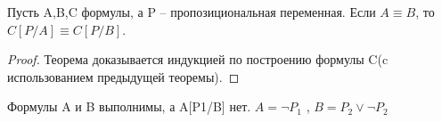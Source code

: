 \begin{theorem}
	Пусть A,B,C формулы, а P -- пропозициональная переменная. Если ${A}\equiv{B}$, то $ { C[P/A]} \equiv  {C[P/B]} $.

\end{theorem}
\begin{proof}
	Теорема доказывается индукцией по построению формулы C(c использованием предыдущей теоремы).
\end{proof}

\begin{example}
	Формулы A и B выполнимы, а A[P1/B] нет.  $A=\neg P_{1}$ , $B=P_{2} \vee \neg P_{2}$
\end{example}
